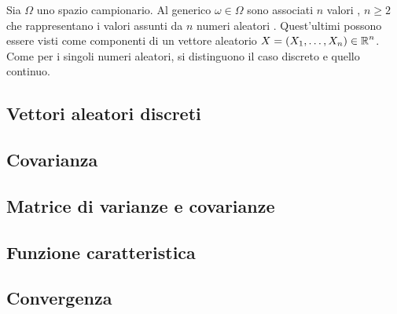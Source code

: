 \documentclass{subfiles}
\begin{document}
Sia \(\Omega\) uno spazio campionario. Al generico \(\omega \in \Omega\) sono associati \(n\) valori ,
\(n \ge 2\) che rappresentano i valori assunti da \(n\) numeri aleatori .
Quest'ultimi possono essere visti come componenti di un vettore aleatorio \(X = \Tuple{X}{1}{n} \in \Real^{n}\).
Come per i singoli numeri aleatori, si distinguono il caso discreto e quello continuo.

\subsection{Vettori aleatori discreti}

\clearpage

\subsection{Covarianza}


\subsection{Matrice di varianze e covarianze}

\clearpage

\subsection{Funzione caratteristica}


\subsection{Convergenza}

\end{document}
